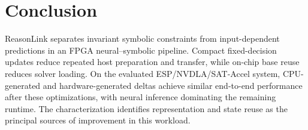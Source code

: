 \section{Conclusion}
ReasonLink separates invariant symbolic constraints from input-dependent predictions in an FPGA neural--symbolic pipeline. Compact fixed-decision updates reduce repeated host preparation and transfer, while on-chip base reuse reduces solver loading. On the evaluated ESP/NVDLA/SAT-Accel system, CPU-generated and hardware-generated deltas achieve similar end-to-end performance after these optimizations, with neural inference dominating the remaining runtime. The characterization identifies representation and state reuse as the principal sources of improvement in this workload.

